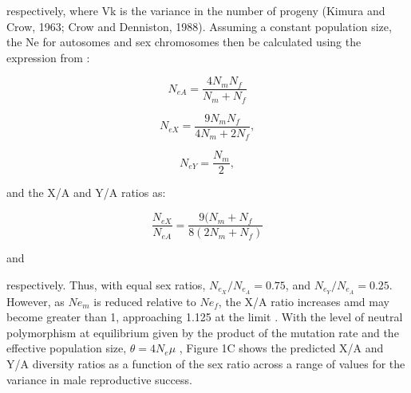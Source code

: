 \documentclass[9pt,twocolumn,twoside]{gsajnl}
\begin{document}
respectively, where Vk is the variance in the number of progeny (Kimura and Crow, 1963; Crow and Denniston, 1988). Assuming a constant population size, the Ne for autosomes and sex chromosomes then be calculated using the expression from \citep{wright1931evolution}:

\begin{equation}
N_{e{A}} = \frac{4N_{m}N_{f}}{N_{m}+N_{f}}\label{eq:Ne}
\end{equation}


\begin{equation}
N_{e{X}} = \frac{9N_{m}N_{f}}{4N_{m}+2N_{f}},\label{eq:NeX}
\end{equation}

\begin{equation}
N_{e{Y}} = \frac{N_{m}}{2},\label{eq:NeY}
\end{equation}

and the X/A and Y/A ratios as:

\begin{equation}
\frac{N_{e{X}}}{N_{e{A}} } = \frac{9(N_{m} + N_{f}}{8(2N_{m} + N_{f})} \label{eq:NeXNeA}
\end{equation}

and


respectively. Thus, with equal sex ratios, $N_{e_{X}}/N_{e_{A}} = 0.75$, and $N_{e_{Y}}/N_{e_{A}} = 0.25$. However, as $Ne_{m}$ is reduced relative to $Ne_{f}$, the X/A ratio increases amd may become greater than 1, approaching 1.125 at the limit \citep{caballero1995}. With the level of neutral polymorphism at equilibrium given by the product of the mutation rate and the effective population size, $\theta=4N_{e}\mu$ \citep{watterson1975,kimura1984}, Figure 1C shows the predicted X/A and Y/A diversity ratios as a function of the sex ratio across a range of values for the variance in male reproductive success.



\end{document}
